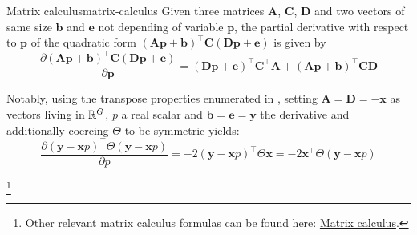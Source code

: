 \begin{Property}{Matrix calculus}{matrix-calculus}
Given three matrices $\boldsymbol{A}$, $\boldsymbol{C}$, $\boldsymbol{D}$ and two vectors of same size $\boldsymbol{b}$ and $\boldsymbol{e}$ not depending of variable $\boldsymbol{p}$, the partial derivative with respect to $\boldsymbol{p}$ of the quadratic form $(\boldsymbol{A} \boldsymbol{p} + \boldsymbol{b})^\top \boldsymbol{C} (\boldsymbol{D} \boldsymbol{p} + \boldsymbol{e})$ is given by 
\begin{equation}
\label{eq:general-calculus-formula}
    \frac{\partial (\boldsymbol{A} \boldsymbol{p} + \boldsymbol{b})^\top \boldsymbol{C} (\boldsymbol{D} \boldsymbol{p} + \boldsymbol{e})}{\partial \boldsymbol{p}} = (\boldsymbol{D} \boldsymbol{p} + \boldsymbol{e})^\top \boldsymbol{C}^\top \boldsymbol{A} + (\boldsymbol{A} \boldsymbol{p} + \boldsymbol{b})^\top \boldsymbol{C} \boldsymbol{D}
\end{equation}

Notably, using the transpose properties enumerated in , setting $\boldsymbol{A} = \boldsymbol{D} = - \boldsymbol{x}$ as vectors living in $\mathbb{R}^G$, $p$ a real scalar and $\boldsymbol{b} = \boldsymbol{e} = \boldsymbol{y}$ the derivative  and additionally coercing $\Theta$ to be symmetric yields:
\begin{equation*}
\label{eq:general-calculus-formula-easy}
    \frac{\partial (\boldsymbol{y} - \boldsymbol{x} p)^\top \Theta (\boldsymbol{y} - \boldsymbol{x} p)}{\partial p} = -2  (\boldsymbol{y} - \boldsymbol{x} p)^\top \Theta \boldsymbol{x} = -2 \boldsymbol{x}^\top \Theta (\boldsymbol{y} - \boldsymbol{x} p)
\end{equation*}

\footnote{Other relevant matrix calculus formulas can be found here: \href{https://en.wikipedia.org/wiki/Matrix_calculus\#Scalar-by-vector}{Matrix calculus}.}
\end{Property}

